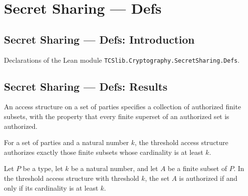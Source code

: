 \section{Secret Sharing --- Defs}
\subsection*{Secret Sharing --- Defs: Introduction}

Declarations of the Lean module \texttt{TCSlib.Cryptography.SecretSharing.Defs}.

\subsection*{Secret Sharing --- Defs: Results}

\begin{definition}
\label{TCSlib.SecretSharing.AccessStructure}
\leanok
An access structure on a set of parties specifies a collection of authorized finite
subsets, with the property that every finite superset of an authorized set is
authorized.
\end{definition}

\begin{definition}
\label{TCSlib.SecretSharing.AccessStructure.threshold}
\leanok
{}
For a set of parties and a natural number $k$, the threshold access structure authorizes
exactly those finite subsets whose cardinality is at least $k$.
\end{definition}

\begin{theorem}
\label{TCSlib.SecretSharing.AccessStructure.threshold_auth}
\leanok
{}
Let $P$ be a type, let $k$ be a natural number, and let $A$ be a finite subset of $P$.
In the threshold access structure with threshold $k$, the set $A$ is authorized if and
only if its cardinality is at least $k$.
\end{theorem}

